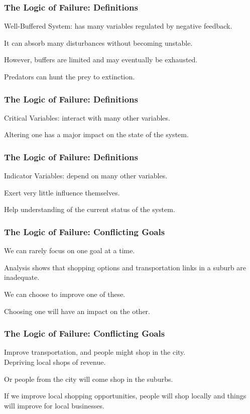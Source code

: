 \begin{frame}
\frametitle{The Logic of Failure: Definitions}
\begin{changemargin}{1cm}
\alert{Well-Buffered System}: has many variables regulated by negative feedback.

It can absorb many disturbances without becoming unstable. 

However, buffers are limited and may eventually be exhausted. 

Predators can hunt the prey to extinction.

\end{changemargin}
\end{frame}

\begin{frame}
\frametitle{The Logic of Failure: Definitions}
\begin{changemargin}{1cm}
\alert{Critical Variables}: interact with many other variables.

Altering one has a major impact on the state of the system.

\end{changemargin}
\end{frame}

\begin{frame}
\frametitle{The Logic of Failure: Definitions}
\begin{changemargin}{1cm}
\alert{Indicator Variables}: depend on many other variables.

Exert very little influence themselves.

Help understanding of the current status of the system. 

\end{changemargin}
\end{frame}


\begin{frame}
\frametitle{The Logic of Failure: Conflicting Goals}
\begin{changemargin}{1cm}
We can rarely focus on one goal at a time.

Analysis shows that shopping options and transportation links in a suburb are inadequate.

We can choose to improve one of these.

Choosing one will have an impact on the other.

\end{changemargin}
\end{frame}

\begin{frame}
\frametitle{The Logic of Failure: Conflicting Goals}
\begin{changemargin}{1cm}
Improve transportation, and people might shop in the city. \\
\quad Depriving local shops of revenue.


Or people from the city will come shop in the suburbs.

If we improve local shopping opportunities, people will shop locally and things will improve for local businesses. 

\end{changemargin}
\end{frame}

